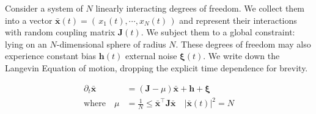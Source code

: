 Consider a system of $N$ linearly interacting degrees of freedom. We collect them into a vector $\mathbf{\bar x}(t) = \left(\,x_1(t),\cdots, x_N(t)\,\right)$ and represent their interactions with random coupling matrix $\mathbf{J}(t)$. We subject them to a global constraint: lying on an $N$-dimensional sphere of radius $N$. These degrees of freedom may also experience constant bias $\mathbf{h}(t)$ external noise $\boldsymbol\xi(t)$. We write down the Langevin Equation of motion, dropping the explicit time dependence for brevity.

\begin{align}
\partial_t\mathbf{\bar x} &= (\mathbf{J}-\mu)\mathbf{\bar x}+\mathbf{h}+\boldsymbol\xi \\
\mathrm{where}\quad\mu &= \frac{1}{N}\le\mathbf{\bar x}^{\top}\mathbf{J}\mathbf{\bar x}\quad|\mathbf{\bar x}(t)|^2=N
\end{align}